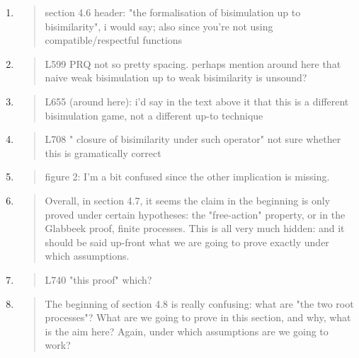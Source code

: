 \begin{enumerate}
\item \begin{quote}
    section 4.6 header: "the formalisation of bisimulation up to
    bisimilarity", i would say; also since you're not using
    compatible/respectful functions
  \end{quote}

\item \begin{quote}
    L599 PRQ not so pretty spacing. perhaps mention around here that
    naive weak bisimulation up to weak bisimilarity is unsound?
  \end{quote}

\item \begin{quote}
    L655 (around here): i'd say in the text above it that this is a
    different bisimulation game, not a different up-to technique
  \end{quote}

\item \begin{quote}
    L708 " closure of bisimilarity under such operator" not sure whether this is gramatically correct
  \end{quote}

\item \begin{quote}
    figure 2: I'm a bit confused since the other implication is missing. 
  \end{quote}

\item \begin{quote}
    Overall, in section 4.7, it seems the claim in the beginning is
    only proved under certain hypotheses: the "free-action" property,
    or in the Glabbeek proof, finite processes. This is all very much
    hidden: and it should be said up-front what we are going to prove
    exactly under which assumptions.
  \end{quote}

\item \begin{quote}
    L740 "this proof" which? 
  \end{quote}

\item \begin{quote}
    The beginning of section 4.8 is really confusing: what are "the
    two root processes"? What are we going to prove in this section,
    and why, what is the aim here? Again, under which assumptions are
    we going to work?
  \end{quote}


\end{enumerate}
